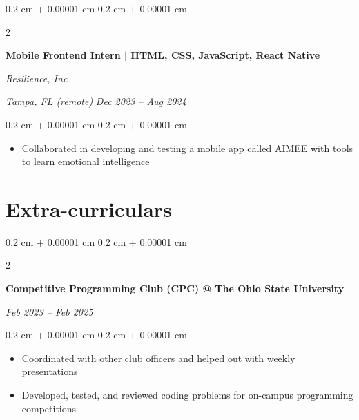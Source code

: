 \documentclass[10pt, letterpaper]{article}
\newenvironment{highlights}{
    \begin{itemize}[
        topsep=0.10 cm,
        parsep=0.10 cm,
        partopsep=0pt,
        itemsep=0pt,
        leftmargin=0.4 cm + 10pt
    ]
}{
    \end{itemize}
} %
\newenvironment{onecolentry}{
    \begin{adjustwidth}{
        0.2 cm + 0.00001 cm
    }{
        0.2 cm + 0.00001 cm
    }
}{
    \end{adjustwidth}
} %
\newenvironment{twocolentry}[2][]{
    \onecolentry
    \def\secondColumn{#2}
    \setcolumnwidth{\fill, 4.5 cm}
    \begin{paracol}{2}
}{
    \switchcolumn \raggedleft \secondColumn
    \end{paracol}
    \endonecolentry
} %
\begin{document}
        \vspace{0.1 cm}

        \begin{twocolentry}{
        \textit{Tampa, FL (remote)}  
        \textit{Dec 2023 – Aug 2024}}
            \textbf{Mobile Frontend Intern \(|\) HTML, CSS, JavaScript, React Native}
            
            \textit{Resilience, Inc}
        \end{twocolentry}
        \vspace{0.10 cm}
        \begin{onecolentry}
            \begin{highlights}
                \item Collaborated in developing and testing a mobile app called AIMEE with tools to learn emotional intelligence
            \end{highlights}
        \end{onecolentry}
        \section{Extra-curriculars}

        \begin{twocolentry}{
        \textit{Feb 2023 – Feb 2025}}
            \textbf{Competitive Programming Club (CPC) @ The Ohio State University}
        \end{twocolentry}
        \vspace{0.1cm}
        \begin{onecolentry}
            \begin{highlights}
                \item Coordinated with other club officers and helped out with weekly presentations
                \item Developed, tested, and reviewed coding problems for on-campus programming competitions
            \end{highlights} 
        \end{onecolentry}
\end{document}
